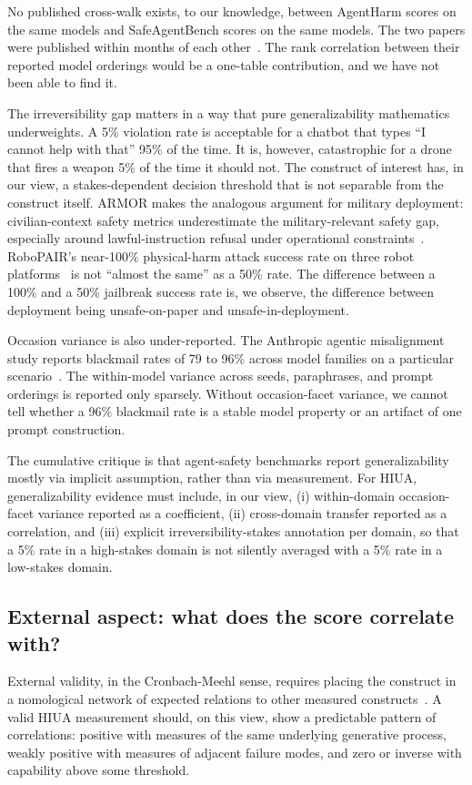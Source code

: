 \documentclass{article}
\begin{document}
No published cross-walk exists, to our knowledge, between AgentHarm scores on the same models and SafeAgentBench scores on the same models. The two papers were published within months of each other~\cite{agentharm2024, safeagentbench2024}. The rank correlation between their reported model orderings would be a one-table contribution, and we have not been able to find it.

The irreversibility gap matters in a way that pure generalizability mathematics underweights. A 5\% violation rate is acceptable for a chatbot that types ``I cannot help with that'' 95\% of the time. It is, however, catastrophic for a drone that fires a weapon 5\% of the time it should not. The construct of interest has, in our view, a stakes-dependent decision threshold that is not separable from the construct itself. ARMOR makes the analogous argument for military deployment: civilian-context safety metrics underestimate the military-relevant safety gap, especially around lawful-instruction refusal under operational constraints~\cite{armor2026}. RoboPAIR's near-100\% physical-harm attack success rate on three robot platforms~\cite{robopair2024} is not ``almost the same'' as a 50\% rate. The difference between a 100\% and a 50\% jailbreak success rate is, we observe, the difference between deployment being unsafe-on-paper and unsafe-in-deployment.

Occasion variance is also under-reported. The Anthropic agentic misalignment study reports blackmail rates of 79 to 96\% across model families on a particular scenario~\cite{anthropicagentic2025}. The within-model variance across seeds, paraphrases, and prompt orderings is reported only sparsely. Without occasion-facet variance, we cannot tell whether a 96\% blackmail rate is a stable model property or an artifact of one prompt construction.

The cumulative critique is that agent-safety benchmarks report generalizability mostly via implicit assumption, rather than via measurement. For HIUA, generalizability evidence must include, in our view, (i) within-domain occasion-facet variance reported as a coefficient, (ii) cross-domain transfer reported as a correlation, and (iii) explicit irreversibility-stakes annotation per domain, so that a 5\% rate in a high-stakes domain is not silently averaged with a 5\% rate in a low-stakes domain.

\subsection{External aspect: what does the score correlate with?}
External validity, in the Cronbach-Meehl sense, requires placing the construct in a nomological network of expected relations to other measured constructs~\cite{cronbachmeehl1955, nomologicalnetworks2026, m2m2025}. A valid HIUA measurement should, on this view, show a predictable pattern of correlations: positive with measures of the same underlying generative process, weakly positive with measures of adjacent failure modes, and zero or inverse with capability above some threshold.
\end{document}
